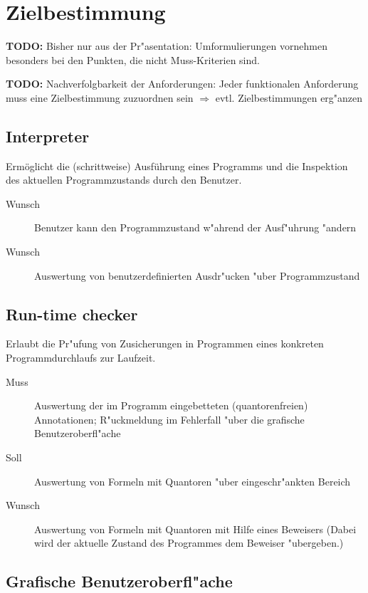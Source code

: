 \section{Zielbestimmung}%

\textbf{TODO:} Bisher nur aus der Pr"asentation: Umformulierungen vornehmen besonders bei den Punkten, die nicht Muss-Kriterien sind.%

\textbf{TODO:} Nachverfolgbarkeit der Anforderungen: Jeder funktionalen Anforderung muss eine Zielbestimmung zuzuordnen sein $\Rightarrow$ evtl. Zielbestimmungen erg"anzen%

\subsection{\see Interpreter}%

Ermöglicht die (schrittweise) Ausführung eines \see Programms und die Inspektion des aktuellen \see Programmzustands durch den Benutzer.%

\begin{description}%
    \item[Wunsch] Benutzer kann den Programmzustand w"ahrend der Ausf"uhrung "andern%
    \item[Wunsch] Auswertung von benutzerdefinierten \see Ausdr"ucken "uber Programmzustand%
\end{description}%

\subsection{\see Run-time checker}%

Erlaubt die Pr"ufung von \see Zusicherungen in Programmen eines konkreten Programmdurchlaufs zur Laufzeit.%

\begin{description}%
    \item [Muss] Auswertung der im Programm eingebetteten (quantorenfreien) \see Annotationen; R"uckmeldung im Fehlerfall "uber die grafische Benutzeroberfl"ache%
    \item [Soll] Auswertung von Formeln mit \see Quantoren "uber eingeschr"ankten Bereich%
    \item [Wunsch] Auswertung von Formeln mit Quantoren mit Hilfe eines \see Beweisers (Dabei wird der aktuelle Zustand des Programmes dem Beweiser "ubergeben.)%
\end{description}%

\subsection{Grafische Benutzeroberfl"ache}%

